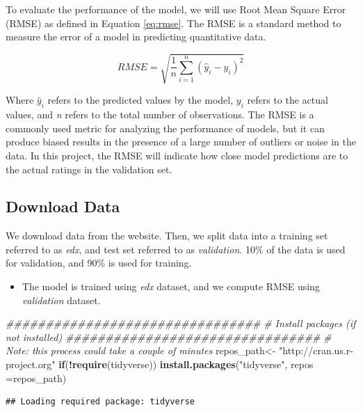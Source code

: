 \documentclass[]{article}
\newenvironment{Shaded}{\begin{snugshade}}{\end{snugshade}}
\newcommand{\CommentTok}[1]{\textcolor[rgb]{0.56,0.35,0.01}{\textit{#1}}}
\newcommand{\ControlFlowTok}[1]{\textcolor[rgb]{0.13,0.29,0.53}{\textbf{#1}}}
\newcommand{\DataTypeTok}[1]{\textcolor[rgb]{0.13,0.29,0.53}{#1}}
\newcommand{\KeywordTok}[1]{\textcolor[rgb]{0.13,0.29,0.53}{\textbf{#1}}}
\newcommand{\NormalTok}[1]{#1}
\newcommand{\OperatorTok}[1]{\textcolor[rgb]{0.81,0.36,0.00}{\textbf{#1}}}
\newcommand{\StringTok}[1]{\textcolor[rgb]{0.31,0.60,0.02}{#1}}
\begin{document}
To evaluate the performance of the model, we will use Root Mean Square
Error (RMSE) \cite{rmse} as defined in Equation \ref{eq:rmse}. The RMSE
is a standard method to measure the error of a model in predicting
quantitative data.

\begin{equation}
\label{eq:rmse}
RMSE = \sqrt{\frac{1}{n}\displaystyle\sum_{i=1}^{n} (\hat{y}_{i}-y_{i})^{2}}
\end{equation}

Where \(\hat{y}_{i}\) refers to the predicted values by the model,
\({y}_{i}\) refers to the actual values, and \emph{n} refers to the
total number of observations. The RMSE is a commonly used metric for
analyzing the performance of models, but it can produce biased results
in the presence of a large number of outliers or noise in the data. In
this project, the RMSE will indicate how close model predictions are to
the actual ratings in the validation set.

\subsection{Download Data}
\label{datadownload}

We download data from the website. Then, we split data into a training
set referred to as \emph{edx}, and test set referred to as
\emph{validation}. 10\% of the data is used for validation, and 90\% is
used for training.

\begin{itemize}
\item The model is trained using \emph{edx} dataset, and 
we compute RMSE using \emph{validation} dataset.
\end{itemize}

\begin{Shaded}
\begin{Highlighting}[]
\CommentTok{################################}
\CommentTok{#  Install packages (if not installed)}
\CommentTok{################################}
\CommentTok{# Note: this process could take a couple of minutes}
\NormalTok{repos_path<-}\StringTok{ "http://cran.us.r-project.org"}
\ControlFlowTok{if}\NormalTok{(}\OperatorTok{!}\KeywordTok{require}\NormalTok{(tidyverse)) }\KeywordTok{install.packages}\NormalTok{(}\StringTok{"tidyverse"}\NormalTok{, }\DataTypeTok{repos =}\NormalTok{repos_path)}
\end{Highlighting}
\end{Shaded}

\begin{verbatim}
## Loading required package: tidyverse
\end{verbatim}
\end{document}
